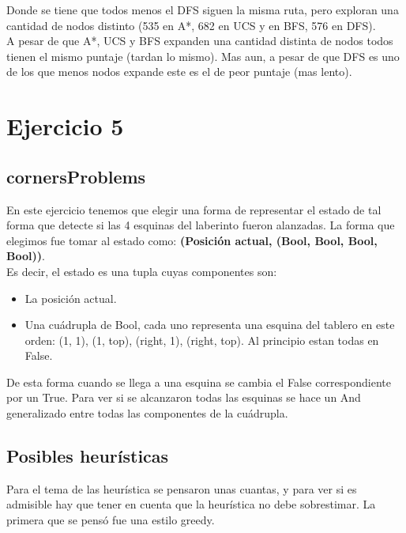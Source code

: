 \documentclass[12pt, titlepage, a4paper]{article}
\begin{document}
Donde se tiene que todos menos el DFS siguen la misma ruta, pero 
exploran una cantidad de nodos distinto (535 en A*, 682 en UCS y en BFS, 576 en DFS). \\

A pesar de que A*, UCS y BFS expanden una cantidad distinta de nodos 
todos tienen el mismo puntaje (tardan lo mismo). Mas aun, a pesar de que DFS es uno de los que 
menos nodos expande este es el de peor puntaje (mas lento).



\section{Ejercicio 5}
\subsection{cornersProblems}
En este ejercicio tenemos que elegir una forma de representar el estado de 
tal forma que detecte si las 4 esquinas del laberinto fueron alanzadas. La 
forma que elegimos fue tomar al estado como: \textbf{(Posición actual, (Bool, Bool, Bool, Bool))}.\\

\noindent Es decir, el estado es una tupla cuyas componentes son:
\begin{itemize}
    \item {La posición actual.}
    \item {Una cuádrupla de Bool, cada uno representa una esquina del tablero en este orden: (1, 1), (1, top), (right, 1), (right, top). Al 
        principio estan todas en False.}
\end{itemize}

De esta forma cuando se llega a una esquina se cambia el False correspondiente por 
un True. Para ver si se alcanzaron todas las esquinas se hace un And generalizado 
entre todas las componentes de la cuádrupla.\\

\subsection{Posibles heurísticas}
Para el tema de las heurística se pensaron unas cuantas, y para ver si es admisible hay que 
tener en cuenta que la heurística no debe sobrestimar. La primera que se pensó fue una estilo greedy.
\end{document}
